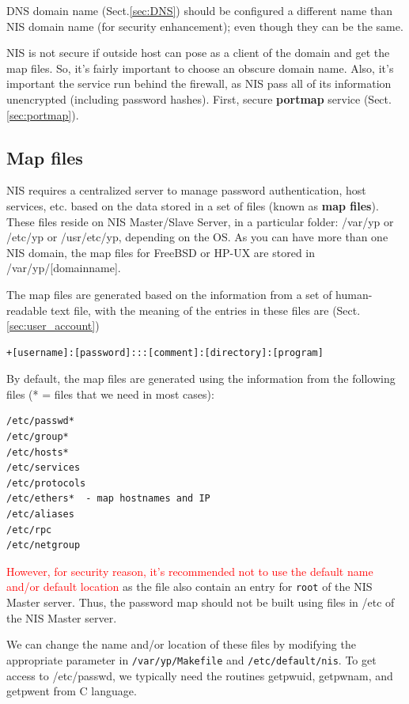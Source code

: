 \begin{framed}
DNS domain name  (Sect.\ref{sec:DNS}) should be configured a different name than
NIS domain name  (for security enhancement); even though they can be the same. 

NIS is not secure if outside host can pose as a client of the domain and get
the map files. So, it's fairly important to choose an obscure domain name. Also,
it's important the service run behind the firewall, as NIS pass all of its
information unencrypted (including password hashes). First, secure {\bf portmap}
service (Sect.\ref{sec:portmap}).
\end{framed}


\subsection{Map files}
\label{sec:NIS_map_files}

NIS requires a centralized server to manage password authentication, host
services, etc. based on the data stored in a set of files (known as {\bf map
files}).  These files reside on NIS Master/Slave Server, in a particular
folder: /var/yp or /etc/yp or /usr/etc/yp, depending on the OS. As you can
have more than one NIS domain, the map files for FreeBSD or HP-UX are stored in
/var/yp/[domainname].

The map files are generated based on the information from a set of
human-readable text file, with the meaning of the entries in these files are 
(Sect.\ref{sec:user_account})
\begin{verbatim}
+[username]:[password]:::[comment]:[directory]:[program] 
\end{verbatim}

\begin{framed}

By default, the map files are generated using the information from the following
files (* = files that we need in most cases):
\begin{verbatim}
/etc/passwd*
/etc/group*
/etc/hosts*
/etc/services
/etc/protocols
/etc/ethers*  - map hostnames and IP
/etc/aliases
/etc/rpc
/etc/netgroup
\end{verbatim}
\textcolor{red}{However, for security reason, it's recommended not to use
the default name and/or default location} as the file also contain an
entry for \verb!root! of the NIS Master server. Thus, the password map should
not be built using files in /etc of the NIS Master server. 

We can change the name and/or location of these files by modifying the
appropriate parameter in \verb!/var/yp/Makefile! and \verb!/etc/default/nis!.
To get access to /etc/passwd, we typically need the routines getpwuid, getpwnam,
and getpwent from C language.
\end{framed}

